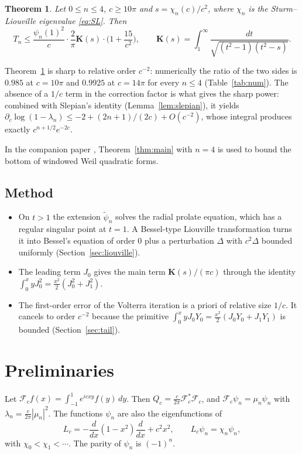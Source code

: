 \documentclass[11pt]{amsart}
\newtheorem{theorem}{Theorem}
\theoremstyle{remark}
\numberwithin{equation}{section}
\newcommand{\F}{\mathcal{F}}
\newcommand{\Kell}{\mathbf{K}}
\begin{document}
\begin{theorem}\label{thm:tail}
Let $0\le n\le4$, $c\ge10\pi$ and $s=\chi_n(c)/c^2$, where $\chi_n$ is the Sturm--Liouville eigenvalue \eqref{eq:SL}. Then
\[
T_n\le\frac{\psi_n(1)^2}{c}\cdot\frac2\pi\Kell(s)\cdot\Big(1+\frac{15}{c^2}\Big),\qquad\Kell(s)=\int_1^\infty\frac{dt}{\sqrt{(t^2-1)(t^2-s)}}.
\]
\end{theorem}

Theorem~\ref{thm:tail} is sharp to relative order $c^{-2}$: numerically the ratio of the two sides is $0.985$ at $c=10\pi$ and $0.9925$ at $c=14\pi$ for every $n\le4$ (Table~\ref{tab:num}). The absence of a $1/c$ term in the correction factor is what gives the sharp power: combined with Slepian's identity (Lemma~\ref{lem:slepian}), it yields $\partial_c\log(1-\lambda_n)\le-2+(2n+1)/(2c)+O(c^{-2})$, whose integral produces exactly $c^{n+1/2}e^{-2c}$.

In the companion paper \cite{MoriWeilII}, Theorem~\ref{thm:main} with $n=4$ is used to bound the bottom of windowed Weil quadratic forms.

\subsection*{Method}
\begin{itemize}
\item On $t>1$ the extension $\tilde\psi_n$ solves the radial prolate equation, which has a regular singular point at $t=1$. A Bessel-type Liouville transformation turns it into Bessel's equation of order $0$ plus a perturbation $\Delta$ with $c^2\Delta$ bounded uniformly (Section~\ref{sec:liouville}).
\item The leading term $J_0$ gives the main term $\Kell(s)/(\pi c)$ through the identity $\int_0^xyJ_0^2=\tfrac{x^2}2(J_0^2+J_1^2)$.
\item The first-order error of the Volterra iteration is a priori of relative size $1/c$. It cancels to order $c^{-2}$ because the primitive $\int_0^xyJ_0Y_0=\tfrac{x^2}2(J_0Y_0+J_1Y_1)$ is bounded (Section~\ref{sec:tail}).
\end{itemize}

\section{Preliminaries}\label{sec:prelim}

Let $\F_cf(x)=\int_{-1}^1e^{icxy}f(y)\,dy$. Then $Q_c=\frac c{2\pi}\F_c^*\F_c$, and $\F_c\psi_n=\mu_n\psi_n$ with $\lambda_n=\frac c{2\pi}|\mu_n|^2$. The functions $\psi_n$ are also the eigenfunctions of
\begin{equation}\label{eq:SL}
L_c=-\frac{d}{dx}(1-x^2)\frac d{dx}+c^2x^2,\qquad L_c\psi_n=\chi_n\psi_n,
\end{equation}
with $\chi_0<\chi_1<\cdots$. The parity of $\psi_n$ is $(-1)^n$.
\end{document}
